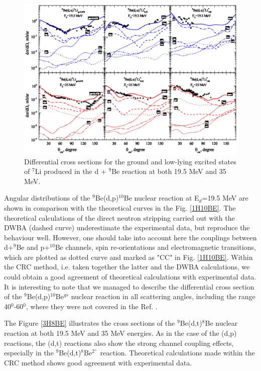 \documentclass[10pt]{iopart}
\begin{document}
\begin{figure}[bp]
\centering
\includegraphics[scale=0.9]{4HE7LI.eps}
\caption{\label{label} Differential cross sections for the ground and low-lying excited states of $^{7}$Li  produced in the d + $^9$Be reaction at  both 19.5 MeV and 35 MeV. }
\label{4HE7LI}
\end{figure}	



Angular distributions of the ${}^9$Be(d,p)${}^{10}$Be nuclear reaction at E$_d$=19.5 MeV are shown in comparison with the theoretical curves in the Fig. \ref{1H10BE}. 
The theoretical calculations of the direct neutron stripping carried out with the DWBA (dashed curve) underestimate the experimental data, but reproduce the behaviour well. 
However, one should take into account here the couplings between d+$^9$Be and p+$^{10}$Be channels, spin re-orientations and electromagnetic transitions, which are plotted as dotted curve and marked as "CC" in Fig. \ref{1H10BE}.
Within the CRC method, i.e. taken together the latter and the DWBA calculations, we could obtain a good agreement of theoretical calculations with experimental data. It is interesting to note that we managed to describe the differential cross section of the ${}^9$Be(d,p)${}^{10}$Be$^{gs}$ nuclear reaction in all scattering angles, including the range 40$^0$-60$^0$, where they were not covered in the Ref. \cite{galanina2012, bodek1989}.

The Figure \ref{3H8BE} illustrates the cross sections of the ${}^9$Be(d,t)${}^{8}$Be nuclear reaction at both 19.5 MeV and 35 MeV energies. As in the case of the (d,p) reactions, the (d,t) reactions also show the strong channel coupling effects, especially in the ${}^9$Be(d,t)${}^{8}$Be$^{2^+}$ reaction. Theoretical calculations made within the CRC method shows good agreement with experimental data.  
\end{document}
